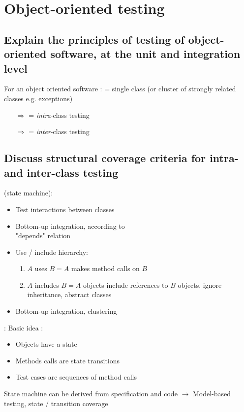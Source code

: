 \chapter{Object-oriented testing}

\section{Explain the principles of testing of object-oriented software, at the unit and integration level}

For an object oriented software :  = single class (or cluster of strongly related classes e.g. exceptions)
\begin{itemize}
    \item [$\Rightarrow$]  = \textit{intra}-class testing
    \item [$\Rightarrow$]  = \textit{inter}-class testing
\end{itemize}

\section{Discuss structural coverage criteria for intra- and inter-class testing}

\begin{minipage}[t]{0.48\textwidth}
     (state machine):
    \begin{itemize}
        \item Test interactions between classes
        \item Bottom-up integration, according to\\ "depends" relation
        \item Use / include hierarchy:
        \begin{enumerate}
            \item $A$ uses $B = A$ makes method calls on $B$
            \item $A$ includes $B = A$ objects include references to $B$ objects, ignore inheritance, abstract classes
        \end{enumerate}
        \item Bottom-up integration, clustering
    \end{itemize}
\end{minipage}
\hfill
\begin{minipage}[t]{0.48\textwidth}
     :
    Basic idea :
    \begin{itemize}
        \item Objects have a state
        \item Methods calls are state transitions
        \item Test cases are sequences of method calls
    \end{itemize}
    State machine can be derived from specification and code $\rightarrow$ Model-based testing, state / transition coverage
\end{minipage}
   
